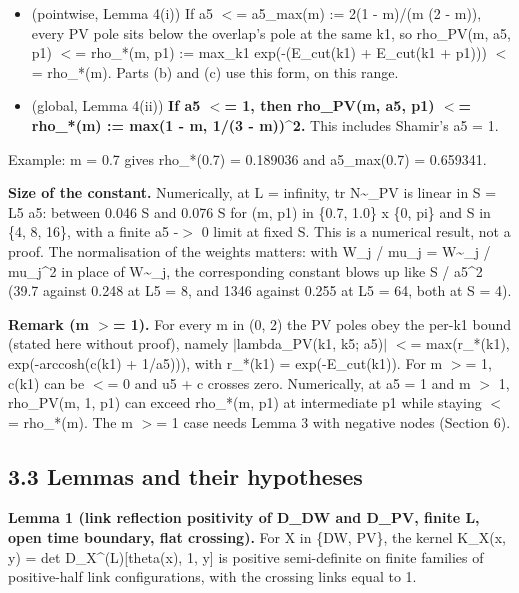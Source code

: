 \documentclass[11pt,a4paper]{article}
\begin{document}
\begin{itemize}
\item{} (pointwise, Lemma 4(i)) If a5 $<$= a5\_max(m) := 2(1 - m)/(m (2 - m)), every PV pole sits below the overlap's pole at
the same k1, so rho\_PV(m, a5, p1) $<$= rho\_*(m, p1) := max\_k1 exp(-(E\_cut(k1) + E\_cut(k1 + p1))) $<$= rho\_*(m).
Parts (b) and (c) use this form, on this range.
\item{} (global, Lemma 4(ii)) {\bfseries\boldmath If a5 $<$= 1, then rho\_PV(m, a5, p1) $<$= rho\_*(m) := max(1 - m, 1/(3 - m))\textasciicircum{}2.} This includes
Shamir's a5 = 1.
\end{itemize}

Example: m = 0.7 gives rho\_*(0.7) = 0.189036 and a5\_max(0.7) = 0.659341.

{\bfseries\boldmath Size of the constant.} Numerically, at L = infinity, tr N\textasciitilde{}\_PV is linear in S = L5 a5: between 0.046 S and
0.076 S for (m, p1) in \{0.7, 1.0\} x \{0, pi\} and S in \{4, 8, 16\}, with a finite a5 -$>$ 0 limit at fixed S. This is a numerical result, not
a proof. The normalisation of the weights matters: with W\_j / mu\_j = W\textasciitilde{}\_j / mu\_j\textasciicircum{}2 in place of W\textasciitilde{}\_j, the corresponding
constant blows up like S / a5\textasciicircum{}2 (39.7 against 0.248 at L5 = 8, and 1346 against 0.255 at L5 = 64, both at S = 4).

{\bfseries\boldmath Remark (m $>$= 1).} For every m in (0, 2) the PV poles obey the per-k1 bound (stated here without proof),
namely $|$lambda\_PV(k1, k5; a5)$|$ $<$= max(r\_*(k1), exp(-arccosh(c(k1) + 1/a5))), with r\_*(k1) = exp(-E\_cut(k1)). For m $>$= 1,
c(k1) can be $<$= 0 and u5 + c crosses zero. Numerically, at a5 = 1 and m $>$ 1, rho\_PV(m, 1, p1) can exceed
rho\_*(m, p1) at intermediate p1 while staying $<$= rho\_*(m). The m $>$= 1 case needs Lemma 3 with negative nodes
(Section 6).


\subsection*{3.3 Lemmas and their hypotheses}
{\bfseries\boldmath Lemma 1 (link reflection positivity of D\_DW and D\_PV, finite L, open time boundary, flat crossing).} For X in
\{DW, PV\}, the kernel K\_X(x, y) = det D\_X\textasciicircum{}(L)[theta(x), 1, y] is positive semi-definite on finite families of
positive-half link configurations, with the crossing links equal to 1.
\end{document}
